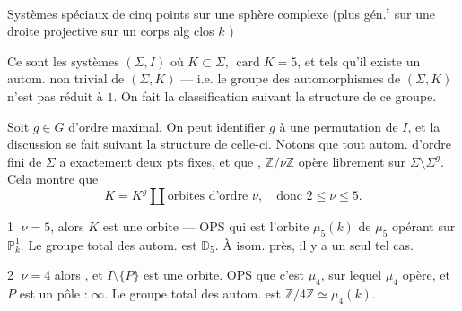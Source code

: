 \unsure{\texttt{//}}

\unsure{\texttt{//}}

\unsure{\texttt{//}}

Systèmes spéciaux de cinq points sur une sphère complexe (plus gén.\textsuperscript{t} sur une  droite projective sur un corps alg clos \(k\) )

Ce sont les systèmes \((\Sigma,I)\) où \(K\subset\Sigma\), \(\operatorname{card}K=5\), et tels qu’il existe un autom. non trivial de \((\Sigma,K)\) --- i.e. le groupe  des automorphismes de \((\Sigma,K)\) n’est pas réduit à \(1\). On fait la classification suivant la structure de ce groupe.

Soit \(g\in G\) d’ordre maximal. On peut identifier \(g\) à une permutation de \(I\), et la discussion se fait suivant la structure de celle-ci. Notons que  tout autom. d’ordre fini de \(\Sigma\)  a exactement deux pts fixes, et que  , \(\mathbb Z/\nu\mathbb Z\) opère librement sur \(\Sigma\setminus\Sigma^g\). Cela montre que
\[
K=K^g\amalg\text{orbites d’ordre }\nu,\quad\text{donc }2\leq\nu\leq5.
\]

\textcircled{1} \(\nu=5\), alors \(K\) est une orbite --- OPS qui est l’orbite \(\mu_5(k)\) de \(\mu_5\) opérant sur \(\mathbb P^1_k\). Le groupe total des autom. est \(\mathbb D_5\). À isom. près, il y a un seul tel cas.


\textcircled{2} \(\nu=4\) alors  , et \(I\setminus\{P\}\) est une orbite. OPS que c’est \(\mu_4\), sur lequel \(\mu_4\) opère, et \(P\) est un pôle : \(\infty\). Le groupe total des autom. est \(\mathbb Z/4\mathbb Z\simeq\mu_4(k)\).

